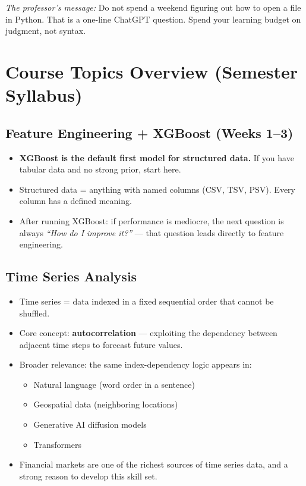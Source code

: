 \documentclass[11pt]{article}
\begin{document}
\textit{The professor's message:} Do not spend a weekend figuring out how to open a file in Python. That is a one-line ChatGPT question. Spend your learning budget on judgment, not syntax.

\newpage
\section{Course Topics Overview (Semester Syllabus)}

\subsection{Feature Engineering + XGBoost (Weeks 1--3)}
\begin{itemize}
    \item \textbf{XGBoost is the default first model for structured data.} If you have tabular data and no strong prior, start here.
    \item Structured data = anything with named columns (CSV, TSV, PSV). Every column has a defined meaning.
    \item After running XGBoost: if performance is mediocre, the next question is always \textit{``How do I improve it?''} --- that question leads directly to feature engineering.
\end{itemize}

\subsection{Time Series Analysis}
\begin{itemize}
    \item Time series = data indexed in a fixed sequential order that cannot be shuffled.
    \item Core concept: \textbf{autocorrelation} --- exploiting the dependency between adjacent time steps to forecast future values.
    \item Broader relevance: the same index-dependency logic appears in:
    \begin{itemize}
        \item Natural language (word order in a sentence)
        \item Geospatial data (neighboring locations)
        \item Generative AI diffusion models
        \item Transformers
    \end{itemize}
    \item Financial markets are one of the richest sources of time series data, and a strong reason to develop this skill set.
\end{itemize}
\end{document}

